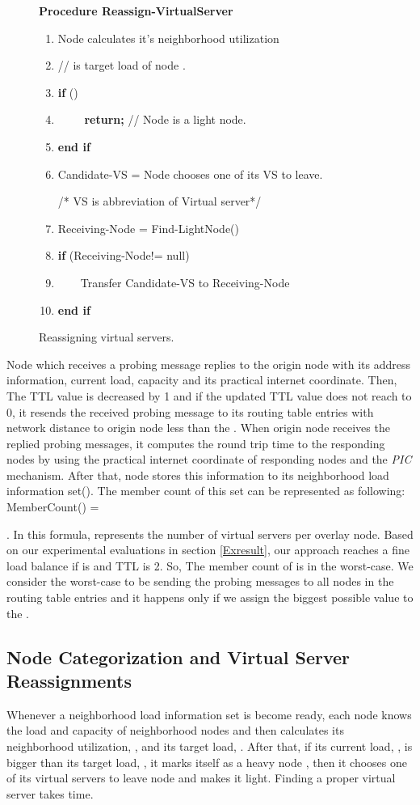 \documentclass {article}
\begin{document}
 \begin{figure}[ht]
\scriptsize
{
{ \bf Procedure Reassign-VirtualServer}
\begin{enumerate}
\itemsep=0mm
\item {   Node  calculates it's neighborhood utilization }
\item 

 //  is target load of node .
\item    { \bf if }() \ \ \ \ \ \
\item  \ \ \ \ { \bf return; } // Node  is a light node.
\item   { \bf end if }
\item   Candidate-VS = Node  chooses one of its VS to leave.

 /* VS is abbreviation  of Virtual server*/
\item  Receiving-Node =  Find-LightNode()
\item  {\bf if} (Receiving-Node!= null)
\item  \ \ \ \  Transfer Candidate-VS to Receiving-Node
\item  {\bf end if}
\end{enumerate}
}
\normalsize
\caption{ Reassigning virtual servers. \label{Reassignment}}
\end{figure}
Node  which receives a probing message replies to the origin node  with its address information, current load, capacity and its practical internet coordinate. Then,
The TTL value is decreased by 1 and if the updated TTL value does not reach to 0,
it resends the received probing message  to its routing table entries with network distance to origin
node  less than the .
When origin node  receives the replied probing messages, it
 computes the round trip time to the responding nodes by using the practical internet coordinate of responding nodes and the\emph{ PIC} mechanism. After that, node  stores this information to its neighborhood load information set(). The member count of this set can be represented as following:
MemberCount() =


.
In this formula,  represents the number of virtual servers per overlay node.
Based on our experimental evaluations in section \ref{Exresult}, our approach reaches a fine load balance if  is  and TTL is 2.
So, The member count of  is  in the worst-case.
We consider the worst-case to be sending the probing messages to all
 nodes in the routing table entries and it happens only if we assign the biggest possible value to the
 .
\subsection{Node Categorization and Virtual Server Reassignments}\label{Reassigning}
Whenever  a neighborhood load information set is become ready, each node  knows the load and capacity of neighborhood nodes and then calculates its neighborhood utilization, , and its target load, .
After that, if its current load, , is bigger than its target load, ,  it marks itself as a heavy node , then it chooses one of its virtual servers to leave node  and makes it light. Finding a proper  virtual server takes  time.
\end{document}

